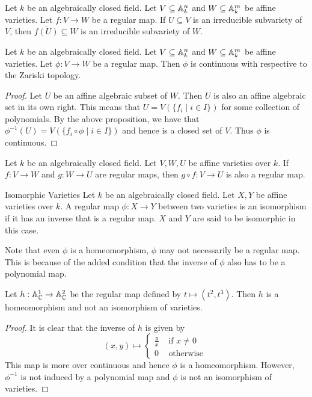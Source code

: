 \documentclass[a4paper]{article}
\begin{document}
\begin{lmm}{}{} Let $k$ be an algebraically closed field. Let $V\subseteq\mathbb{A}_k^n$ and $W\subseteq\mathbb{A}_k^m$ be affine varieties. Let $f:V\to W$ be a regular map. If $U\subseteq V$ is an irreducible subvariety of $V$, then $\overline{f(U)}\subseteq W$ is an irreducible subvariety of $W$. 
\end{lmm}

\begin{thm}{}{} Let $k$ be an algebraically closed field. Let $V\subseteq\mathbb{A}_k^n$ and $W\subseteq\mathbb{A}_k^m$ be affine varieties. Let $\phi:V\to W$ be a regular map. Then $\phi$ is continuous with respective to the Zariski topology. \tcbline
\begin{proof}
Let $U$ be an affine algebraic subset of $W$. Then $U$ is also an affine algebraic set in its own right. This means that $U=V(\{f_i\;|\;i\in I\})$ for some collection of polynomials. By the above proposition, we have that $\phi^{-1}(U)=V(\{f_i\circ\phi\;|\;i\in I\})$ and hence is a closed set of $V$. Thus $\phi$ is continuous. 
\end{proof}
\end{thm}

\begin{prp}{}{} Let $k$ be an algebraically closed field. Let $V,W,U$ be affine varieties over $k$. If $f:V\to W$ and $g:W\to U$ are regular maps, then $g\circ f:V\to U$ is also a regular map. 
\end{prp}

\begin{defn}{Isomorphic Varieties}{} Let $k$ be an algebraically closed field. Let $X,Y$ be affine varieties over $k$. A regular map $\phi:X\to Y$ between two varieties is an isomorphism if it has an inverse that is a regular map. $X$ and $Y$ are said to be isomorphic in this case. 
\end{defn}

Note that even $\phi$ is a homeomorphism, $\phi$ may not necessarily be a regular map. This is because of the added condition that the inverse of $\phi$ also has to be a polynomial map. 

\begin{eg}{}{} Let $h:\mathbb{A}_{\mathbb{C}}^1\to\mathbb{A}_{\mathbb{C}}^2$ be the regular map defined by $t\mapsto(t^2,t^3)$. Then $h$ is a homeomorphism and not an isomorphism of varieties. \tcbline
\begin{proof}
It is clear that the inverse of $h$ is given by $$(x,y)\mapsto\begin{cases}
\frac{y}{x} & \text{ if }x\neq 0\\
0 & \text{ otherwise }
\end{cases}$$ This map is more over continuous and hence $\phi$ is a homeomorphism. However, $\phi^{-1}$ is not induced by a polynomial map and $\phi$ is not an isomorphism of varieties. 
\end{proof}
\end{eg}
\end{document}

